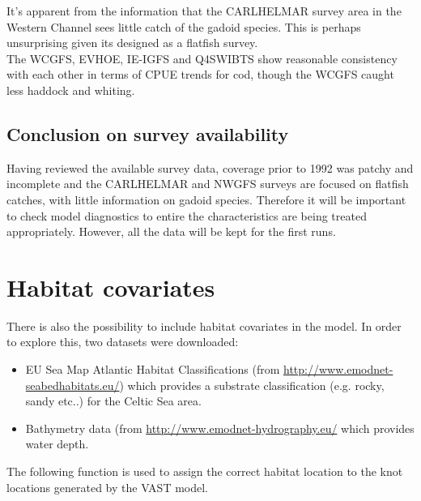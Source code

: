 \documentclass[12pt]{article}\usepackage[]{graphicx}\usepackage[]{color}
\begin{document}
It's apparent from the information that the CARLHELMAR survey area in the
Western Channel sees little catch of the gadoid species. This is perhaps
unsurprising given its designed as a flatfish survey. \\

The WCGFS, EVHOE, IE-IGFS and Q4SWIBTS show reasonable consistency with each
other in terms of CPUE trends for cod, though the WCGFS caught less haddock and
whiting. \\

\subsection{Conclusion on survey availability}

Having reviewed the available survey data, coverage prior to 1992 was patchy
and incomplete and the CARLHELMAR and NWGFS surveys are focused on flatfish
catches, with little information on gadoid species. Therefore it will be
important to check model diagnostics to entire the characteristics are being
treated appropriately. However, all the data will be kept for the first runs.\\

\section{Habitat covariates}

There is also the possibility to include habitat covariates in the model. In
order to explore this, two datasets were downloaded:

\begin{itemize}
	\item EU Sea Map Atlantic Habitat Classifications (from
		\url{http://www.emodnet-seabedhabitats.eu/}) which provides a
		substrate classification (e.g. rocky, sandy etc..) for the
		Celtic Sea area.
	\item Bathymetry data (from \url{http://www.emodnet-hydrography.eu/}
		which provides water depth.

\end{itemize}

The following function is used to assign the correct habitat location to the
knot locations generated by the VAST model. \\
\end{document}
